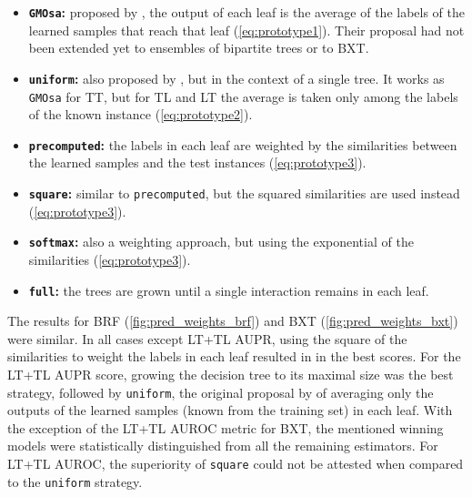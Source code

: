 \begin{itemize}
    \item \textbf{\texttt{GMOsa}:} proposed by , the output of each leaf is the average of the labels of the learned samples that reach that leaf (\autoref{eq:prototype1}). Their proposal had not been extended yet to ensembles of bipartite trees or to BXT.
    \item \textbf{\texttt{uniform}:} also proposed by , but in the context of a single tree. It works as \texttt{GMOsa} for TT, but for TL and LT the average is taken only among the labels of the known instance (\autoref{eq:prototype2}).
    \item \textbf{\texttt{precomputed}:}
    the labels in each leaf are weighted by the similarities between the learned samples and the test instances (\autoref{eq:prototype3}).
    \item \textbf{\texttt{square}:} similar to \texttt{precomputed}, but the squared similarities are used instead (\autoref{eq:prototype3}).
    \item \textbf{\texttt{softmax}:} also a weighting approach, but using the exponential of the similarities (\autoref{eq:prototype3}).
    \item \textbf{\texttt{full}:} the trees are grown until a single interaction remains in each leaf. %
\end{itemize}


The results for BRF (\autoref{fig:pred_weights_brf}) and BXT (\autoref{fig:pred_weights_bxt}) were similar. In all cases except LT+TL AUPR, using the square of the similarities to weight the labels in each leaf resulted in in the best scores. For the LT+TL AUPR score, growing the decision tree to its maximal size was the best strategy, followed by \texttt{uniform}, the original proposal by  of averaging only the 
outputs of the learned samples (known from the training set) in each leaf. With the exception of the LT+TL AUROC metric for BXT, the mentioned winning models were statistically distinguished from all the remaining estimators. For LT+TL AUROC, the superiority of \texttt{square} could not be attested when compared to the \texttt{uniform} strategy.


